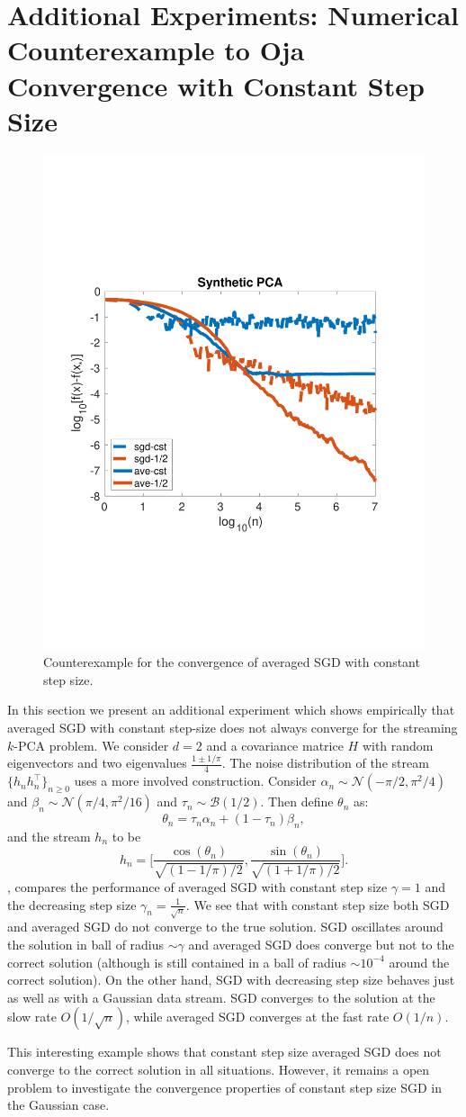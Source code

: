 \section{Additional Experiments: Numerical Counterexample to Oja Convergence with Constant Step Size}
\label{sec:counter}
 \begin{figure}[!ht]
\centering
  \includegraphics[width=0.8\linewidth]{Figs/counter2.pdf}
  \vspace{-3.0cm}
  \caption{Counterexample for the convergence of averaged SGD with constant step size.}
     \label{fig:counter}
\end{figure}
In this section we present an additional experiment which shows empirically that averaged SGD with constant step-size does not always converge for the streaming $k$-PCA problem. We consider $d=2$ and  a covariance matrice $H$ with random eigenvectors and two eigenvalues $\frac{1\pm1/\pi}{4}$. The noise distribution of the stream $\{h_n h_n^\top \}_{n\geq0}$ uses a more involved construction. Consider $\alpha_n\sim\mathcal N(-\pi/2,\pi^2/4)$ and $\beta_n\sim\mathcal N(\pi/4,\pi^2/16)$ and $\tau_n\sim \mathcal{B}(1/2)$. Then define $\theta_n$ as:
\[
\theta_n= \tau_n \alpha_n+(1-\tau_n)\beta_n,
\]
and the stream $h_n$ to be
\[
h_n= \Big[\frac{\cos(\theta_n)}{\sqrt{(1-1/\pi)/2}}, \frac{\sin(\theta_n)}{\sqrt{(1+1/\pi)/2}}\Big].
\]
, compares the performance of averaged SGD with constant step size $\gamma=1$ and the decreasing step size $\gamma_n=\frac{1}{\sqrt{n}}$. We see that with constant step size both SGD and averaged SGD do not converge to the true solution. SGD oscillates around the solution in ball of radius $\sim \gamma$ and averaged SGD does converge but not to the correct solution (although is still contained in a ball of radius $\sim 10^{-4}$ around the correct solution). On the other hand, SGD with decreasing step size behaves just as well as with a Gaussian data stream. SGD converges to the solution at the slow rate $O(1/\sqrt{n})$, while averaged SGD converges at the fast rate $O(1/{n})$.

This interesting example shows that constant step size averaged SGD does not converge to the correct solution in all situations. However, it remains a open problem to investigate the convergence properties of constant step size SGD in the Gaussian case.
